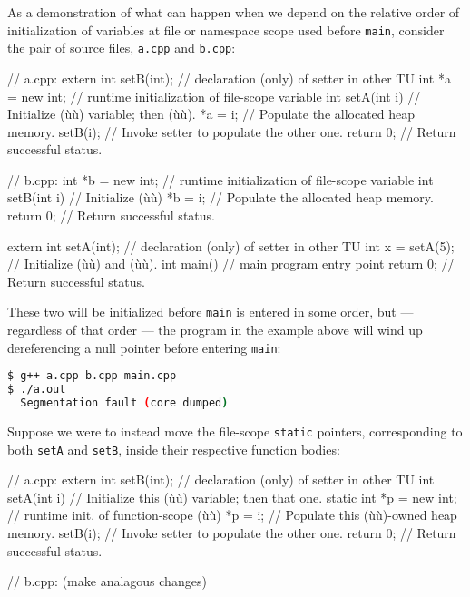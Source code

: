 As a demonstration of what can happen when we depend on the relative
order of initialization of variables at file or
namespace scope used before \lstinline!main!, consider the
 pair of source files, \lstinline!a.cpp! and
\lstinline!b.cpp!:

\begin{emcppslisting}
// a.cpp:
extern int setB(int);  // declaration (only) of setter in other TU
int *a = new int;      // runtime initialization of file-scope variable
int setA(int i)        // Initialize (ù{}ù) variable; then (ù{}ù).
{
    *a = i;            // Populate the allocated heap memory.
    setB(i);           // Invoke setter to populate the other one.
    return 0;          // Return successful status.
}

// b.cpp:
int *b = new int;      // runtime initialization of file-scope variable
int setB(int i)        // Initialize (ù{}ù)
{
    *b = i;            // Populate the allocated heap memory.
    return 0;          // Return successful status.
}

extern int setA(int);  // declaration (only) of setter in other TU
int x = setA(5);       // Initialize (ù{}ù) and (ù{}ù).
int main()             // main program entry point
{
    return 0;          // Return successful status.
}
\end{emcppslisting}

\noindent These two  will be initialized before \lstinline!main! is
entered in some order, but --- regardless of that order --- the program
in the example above will wind up dereferencing a null pointer
before entering \lstinline!main!:

\begin{lstlisting}[language=bash]
$ g++ a.cpp b.cpp main.cpp
$ ./a.out
  Segmentation fault (core dumped)
\end{lstlisting}

\noindent Suppose we were to instead move the file-scope \lstinline!static! pointers,
corresponding to both \lstinline!setA! and \lstinline!setB!, inside their
respective function bodies:

\begin{emcppslisting}
// a.cpp:
extern int setB(int);  // declaration (only) of setter in other TU
int setA(int i)        // Initialize this (ù{}ù) variable; then that one.
{
    static int *p = new int;  // runtime init. of function-scope (ù{}ù)
    *p = i;                   // Populate this (ù{}ù)-owned heap memory.
    setB(i);                  // Invoke setter to populate the other one.
    return 0;                 // Return successful status.
}

// b.cpp: (make analagous changes)
\end{emcppslisting}


